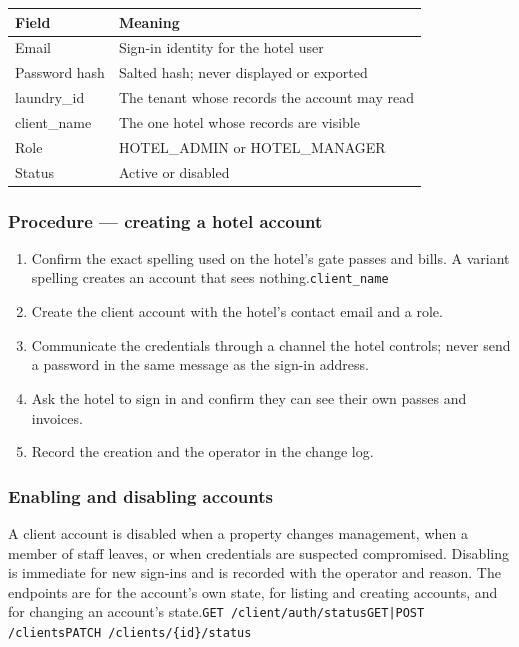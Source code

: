 \documentclass[11pt,a4paper,oneside]{book}
\begin{document}
\begin{center}\small
\begin{tabularx}{\linewidth}{|X|X|}
\hline
\rowcolor{lightgrey}
\textbf{Field} & \textbf{Meaning} \\ \hline
Email & Sign-in identity for the hotel user \\ \hline
Password hash & Salted hash; never displayed or exported \\ \hline
laundry\_id & The tenant whose records the account may read \\ \hline
client\_name & The one hotel whose records are visible \\ \hline
Role & HOTEL\_ADMIN or HOTEL\_MANAGER \\ \hline
Status & Active or disabled \\ \hline
\end{tabularx}
\end{center}
\subsubsection*{Procedure — creating a hotel account}
\begin{enumerate}
\item Confirm the exact  spelling used on the hotel's gate passes and bills. A variant spelling creates an account that sees nothing.\texttt{client\_name}
\item Create the client account with the hotel's contact email and a role.
\item Communicate the credentials through a channel the hotel controls; never send a password in the same message as the sign-in address.
\item Ask the hotel to sign in and confirm they can see their own passes and invoices.
\item Record the creation and the operator in the change log.
\end{enumerate}
\subsubsection*{Enabling and disabling accounts}
A client account is disabled when a property changes management, when a member of staff leaves, or when credentials are suspected compromised. Disabling is immediate for new sign-ins and is recorded with the operator and reason. The endpoints are  for the account's own state,  for listing and creating accounts, and  for changing an account's state.\texttt{GET /client/auth/status}\texttt{GET|POST /clients}\texttt{PATCH /clients/\{id\}/status}
\end{document}
